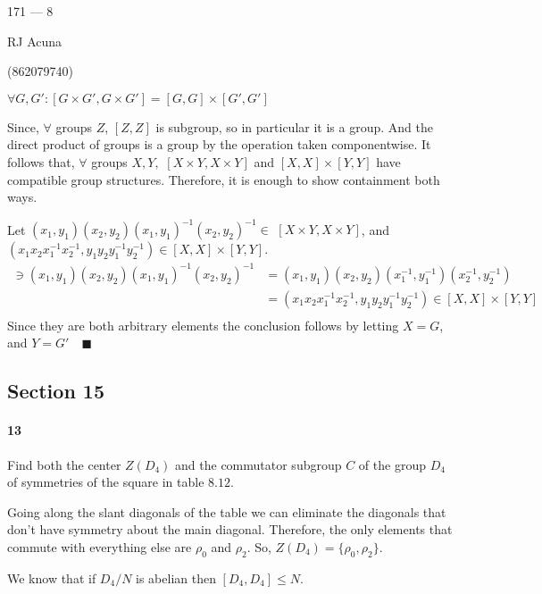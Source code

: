 \documentclass{article}
\begin{document}
\begin{center}
  171 --- 8

  RJ Acuna

  (862079740)
\end{center}\vspace{1.618em}

$\forall G, G': [G\times G',G\times G'] = [G,G]\times[G',G']$


Since, $\forall$ groups $Z$, $[Z,Z]$  is subgroup, so in particular it
is a group. And the direct product of groups is a group by the
operation taken componentwise. It follows that, $\forall$ groups
$X,Y,$ $[X\times Y, X\times Y]$ and $[X,X]\times [Y,Y]$ have compatible
group structures. Therefore, it is enough to show containment both
ways.

Let $(x_1,y_1)(x_2,y_2)(x_1,y_1)^{-1}(x_2,y_2)^{-1}\in$ $[X\times Y,
X\times Y]$, and $(x_1x_2x_1^{-1}x_2^{-1},y_1y_2y_1^{-1}y_2^{-1}) \in
[X,X]\times [Y,Y]$.
\begin{align*}
[X\times Y,
X\times Y] \ni (x_1,y_1)(x_2,y_2)(x_1,y_1)^{-1}(x_2,y_2)^{-1} &=
                                                 (x_1,y_1)(x_2,y_2)(x_1^{-1},y_1^{-1})(x_2^{-1},y_2^{-1})\\
                                               &=
                                                 (x_1x_2x_1^{-1}x_2^{-1},y_1y_2y_1^{-1}y_2^{-1})
  \in [X,X]\times [Y,Y]\\
\end{align*}
Since they are both arbitrary elements the conclusion follows by
letting $X = G$, and $Y = G'\quad \blacksquare$
\subsection*{Section 15}

\paragraph{13} Find both the center $Z(D_4)$ and the commutator
subgroup $C$ of the group $D_4$ of symmetries of the square in table
$8.12.$


Going along the slant diagonals of the table we can eliminate the
diagonals that don't have symmetry about the main diagonal. Therefore,
the only elements that commute with everything else are $\rho_0$ and
$\rho_2$. So, $Z(D_4) =\{\rho_0,\rho_2\}.$

We know that if $D_4/N$ is abelian then $[D_4,D_4]\leq N$.
\end{document}
